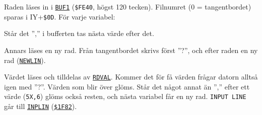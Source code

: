 \begin{Listing}
\Gap
{}
\begin{Note}\par\noindent Raden läses in i \hyperlink{v:BUF1}{\texttt{BUF1}} (\texttt{\$FE40}, högst 120 tecken). Filnumret (0 = tangentbordet) sparas i IY+\texttt{\$0D}. För varje variabel:\par
\begin{Punkter}
\item Står det ”,” i bufferten tas nästa värde efter det.
\item Annars läses en ny rad. Från tangentbordet skrivs först ”?”, och efter raden en ny rad (\hyperlink{l:NEWLIN}{\texttt{NEWLIN}}).
\end{Punkter}
\par\noindent Värdet läses och tilldelas av \hyperlink{l:RDVAL}{\texttt{RDVAL}}. Kommer det för få värden frågar datorn alltså igen med ”?”. Värden som blir över glöms. Står det något annat än ”,” efter ett värde (\texttt{5X,6}) glöms också resten, och nästa variabel får en ny rad. \texttt{INPUT LINE} går till \hyperlink{l:INPLIN}{\texttt{INPLIN}} (\hyperlink{a:1F82}{\texttt{\$1F82}}).\par\end{Note}

\end{Listing}
